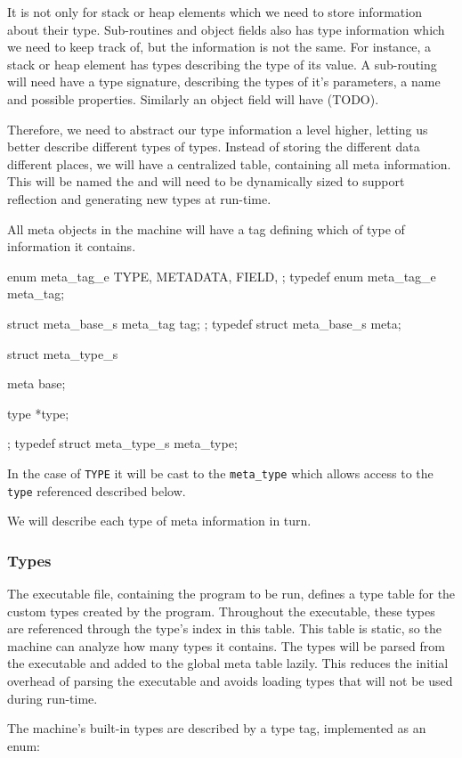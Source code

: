 It is not only for stack or heap elements which we need to store information
about their type. Sub-routines and object fields also has type information which
we need to keep track of, but the information is not the same. For instance, a
stack or heap element has types describing the type of its value. A sub-routing
will need have a type signature, describing the types of it's parameters, a name
and possible properties. Similarly an object field will have (TODO).

Therefore, we need to abstract our type information a level higher, letting us
better describe different types of types. Instead of storing the different data
different places, we will have a centralized table, containing all meta
information. This will be named the  and will need to be
dynamically sized to support reflection and generating new types at run-time.

All meta objects in the machine will have a tag defining which of type of
information it contains.
\begin{ccode}
enum meta_tag_e {
    TYPE,
    METADATA,
    FIELD,
};
typedef enum meta_tag_e meta_tag;

struct meta_base_s {
    meta_tag tag;
};
typedef struct meta_base_s meta;

struct meta_type_s {
    meta base;

    type *type;
};
typedef struct meta_type_s meta_type;
\end{ccode}
In the case of {\tt TYPE} it will be cast to the {\tt meta\_type} which allows
access to the {\tt type} referenced described below.

We will describe each type of meta information in turn.

\subsubsection{Types}
\label{sec:implementation:meta:types}
The executable file, containing the program to be run, defines a type table for
the custom types created by the program. Throughout the executable, these types
are referenced through the type's index in this table. This table is static, so
the machine can analyze how many types it contains. The types will be parsed
from the executable and added to the global meta table lazily. This reduces the
initial overhead of parsing the executable and avoids loading types that will
not be used during run-time.

The machine's built-in types are described by a type tag, implemented as an enum:

